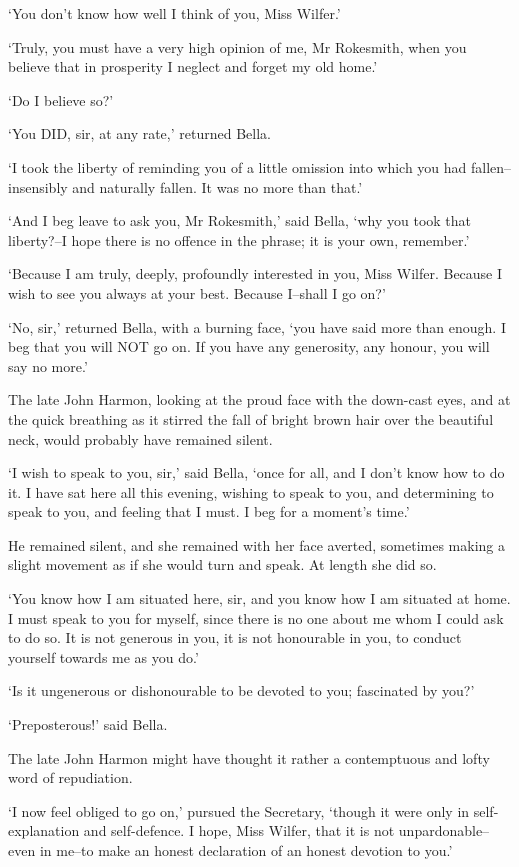 ‘You don’t know how well I think of you, Miss Wilfer.’

‘Truly, you must have a very high opinion of me, Mr Rokesmith, when you
believe that in prosperity I neglect and forget my old home.’

‘Do I believe so?’

‘You DID, sir, at any rate,’ returned Bella.

‘I took the liberty of reminding you of a little omission into which you
had fallen--insensibly and naturally fallen. It was no more than that.’

‘And I beg leave to ask you, Mr Rokesmith,’ said Bella, ‘why you took
that liberty?--I hope there is no offence in the phrase; it is your own,
remember.’

‘Because I am truly, deeply, profoundly interested in you, Miss Wilfer.
Because I wish to see you always at your best. Because I--shall I go
on?’

‘No, sir,’ returned Bella, with a burning face, ‘you have said more than
enough. I beg that you will NOT go on. If you have any generosity, any
honour, you will say no more.’

The late John Harmon, looking at the proud face with the down-cast eyes,
and at the quick breathing as it stirred the fall of bright brown hair
over the beautiful neck, would probably have remained silent.

‘I wish to speak to you, sir,’ said Bella, ‘once for all, and I don’t
know how to do it. I have sat here all this evening, wishing to speak to
you, and determining to speak to you, and feeling that I must. I beg for
a moment’s time.’

He remained silent, and she remained with her face averted, sometimes
making a slight movement as if she would turn and speak. At length she
did so.

‘You know how I am situated here, sir, and you know how I am situated
at home. I must speak to you for myself, since there is no one about
me whom I could ask to do so. It is not generous in you, it is not
honourable in you, to conduct yourself towards me as you do.’

‘Is it ungenerous or dishonourable to be devoted to you; fascinated by
you?’

‘Preposterous!’ said Bella.

The late John Harmon might have thought it rather a contemptuous and
lofty word of repudiation.

‘I now feel obliged to go on,’ pursued the Secretary, ‘though it were
only in self-explanation and self-defence. I hope, Miss Wilfer, that
it is not unpardonable--even in me--to make an honest declaration of an
honest devotion to you.’

